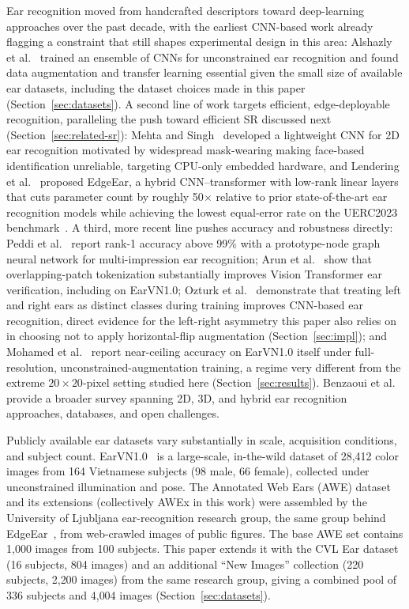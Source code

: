 \documentclass[pdflatex,sn-vancouver-num]{sn-jnl}
\begin{document}
Ear recognition moved from handcrafted descriptors toward deep-learning approaches over the past decade, with the earliest CNN-based work already flagging a constraint that still shapes experimental design in this area: Alshazly et al.~\cite{alshazly2020unconstrained} trained an ensemble of CNNs for unconstrained ear recognition and found data augmentation and transfer learning essential given the small size of available ear datasets, including the dataset choices made in this paper (Section~\ref{sec:datasets}). A second line of work targets efficient, edge-deployable recognition, paralleling the push toward efficient SR discussed next (Section~\ref{sec:related-sr}): Mehta and Singh~\cite{mehta2023ear} developed a lightweight CNN for 2D ear recognition motivated by widespread mask-wearing making face-based identification unreliable, targeting CPU-only embedded hardware, and Lendering et al.~\cite{lendering2025edgeear} proposed EdgeEar, a hybrid CNN--transformer with low-rank linear layers that cuts parameter count by roughly 50$\times$ relative to prior state-of-the-art ear recognition models while achieving the lowest equal-error rate on the UERC2023 benchmark~\cite{emersic2023uerc}. A third, more recent line pushes accuracy and robustness directly: Peddi et al.~\cite{peddi2025proton} report rank-1 accuracy above 99\% with a prototype-node graph neural network for multi-impression ear recognition; Arun et al.~\cite{arun2025vitear} show that overlapping-patch tokenization substantially improves Vision Transformer ear verification, including on EarVN1.0; Ozturk et al.~\cite{ozturk2025bilateral} demonstrate that treating left and right ears as distinct classes during training improves CNN-based ear recognition, direct evidence for the left-right asymmetry this paper also relies on in choosing not to apply horizontal-flip augmentation (Section~\ref{sec:impl}); and Mohamed et al.~\cite{mohamed2024earbiometrics} report near-ceiling accuracy on EarVN1.0 itself under full-resolution, unconstrained-augmentation training, a regime very different from the extreme $20\times20$-pixel setting studied here (Section~\ref{sec:results}). Benzaoui et al.~\cite{benzaoui2023survey} provide a broader survey spanning 2D, 3D, and hybrid ear recognition approaches, databases, and open challenges.

Publicly available ear datasets vary substantially in scale, acquisition conditions, and subject count. EarVN1.0~\cite{hoang2019earvn} is a large-scale, in-the-wild dataset of 28{,}412 color images from 164 Vietnamese subjects (98 male, 66 female), collected under unconstrained illumination and pose. The Annotated Web Ears (AWE) dataset~\cite{emersic2017ear} and its extensions (collectively AWEx in this work) were assembled by the University of Ljubljana ear-recognition research group, the same group behind EdgeEar~\cite{lendering2025edgeear}, from web-crawled images of public figures. The base AWE set contains 1{,}000 images from 100 subjects. This paper extends it with the CVL Ear dataset (16 subjects, 804 images) and an additional ``New Images'' collection (220 subjects, 2{,}200 images) from the same research group, giving a combined pool of 336 subjects and 4{,}004 images (Section~\ref{sec:datasets}).
\end{document}
